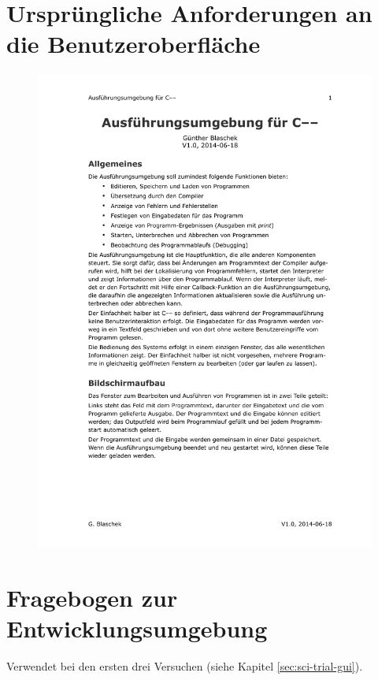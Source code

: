\documentclass[11pt, oneside]{book}   		%
\begin{document}


\pagebreak

\section{Ursprüngliche Anforderungen an die Benutzeroberfläche}
\label{app:anf-gui}

\begin{figure}[h!]
	\centering
	\includegraphics[width=1.0\textwidth]{./media/docs/Anforderung-gui.pdf}
\end{figure}



\pagebreak
\section{Fragebogen zur Entwicklungsumgebung}
Verwendet bei den ersten drei Versuchen (siehe Kapitel \ref{sec:sci-trial-gui}).
\end{document}
